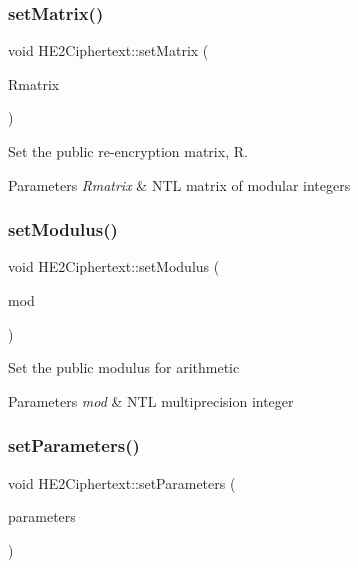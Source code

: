 \subsubsection{\texorpdfstring{set\+Matrix()}{setMatrix()}}
{\footnotesize\ttfamily void H\+E2\+Ciphertext\+::set\+Matrix (\begin{DoxyParamCaption}\item[{N\+T\+L\+::mat\+\_\+\+Z\+Z\+\_\+p $\ast$}]{Rmatrix }\end{DoxyParamCaption})\hspace{0.3cm}{\ttfamily [static]}}

Set the public re-\/encryption matrix, {\ttfamily R}. 
\begin{DoxyParams}{Parameters}
{\em Rmatrix} & N\+TL matrix of modular integers \\
\hline
\end{DoxyParams}
\mbox{\label{classHE2Ciphertext_afb27eefed819559aaebdaf0eb10d7311}} 
\subsubsection{\texorpdfstring{set\+Modulus()}{setModulus()}}
{\footnotesize\ttfamily void H\+E2\+Ciphertext\+::set\+Modulus (\begin{DoxyParamCaption}\item[{N\+T\+L\+::\+ZZ \&}]{mod }\end{DoxyParamCaption})\hspace{0.3cm}{\ttfamily [static]}}

Set the public modulus for arithmetic 
\begin{DoxyParams}{Parameters}
{\em mod} & N\+TL multiprecision integer \\
\hline
\end{DoxyParams}
\mbox{\label{classHE2Ciphertext_ae3b1a39f8c20cc4d97bcc1ea70cf641e}} 
\subsubsection{\texorpdfstring{set\+Parameters()}{setParameters()}}
{\footnotesize\ttfamily void H\+E2\+Ciphertext\+::set\+Parameters (\begin{DoxyParamCaption}\item[{std\+::string \&}]{parameters }\end{DoxyParamCaption})\hspace{0.3cm}{\ttfamily [static]}}

